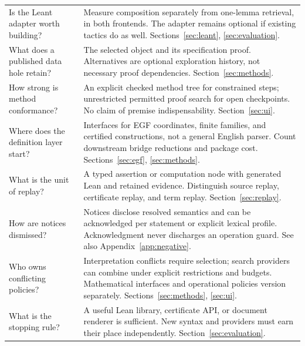 \documentclass[11pt,a4paper]{article}
\theoremstyle{definition}
\theoremstyle{remark}
\begin{document}
\begin{longtable}{@{}P{.30\textwidth}P{.62\textwidth}@{}}
Is the Leant adapter worth building? & Measure composition separately from one-lemma retrieval, in both frontends. The adapter remains optional if existing tactics do as well. Sections~\ref{sec:leant}, \ref{sec:evaluation}.\\
What does a published data hole retain? & The selected object and its specification proof. Alternatives are optional exploration history, not necessary proof dependencies. Section~\ref{sec:methods}.\\
How strong is method conformance? & An explicit checked method tree for constrained steps; unrestricted permitted proof search for open checkpoints. No claim of premise indispensability. Section~\ref{sec:ui}.\\
Where does the definition layer start? & Interfaces for EGF coordinates, finite families, and certified constructions, not a general English parser. Count downstream bridge reductions and package cost. Sections~\ref{sec:egf}, \ref{sec:methods}.\\
What is the unit of replay? & A typed assertion or computation node with generated Lean and retained evidence. Distinguish source replay, certificate replay, and term replay. Section~\ref{sec:replay}.\\
How are notices dismissed? & Notices disclose resolved semantics and can be acknowledged per statement or explicit lexical profile. Acknowledgment never discharges an operation guard. See also Appendix~\ref{app:negative}.\\
Who owns conflicting policies? & Interpretation conflicts require selection; search providers can combine under explicit restrictions and budgets. Mathematical interfaces and operational policies version separately. Sections~\ref{sec:methods}, \ref{sec:ui}.\\
What is the stopping rule? & A useful Lean library, certificate API, or document renderer is sufficient. New syntax and providers must earn their place independently. Section~\ref{sec:evaluation}.\\
\bottomrule
\end{longtable}

\end{document}

